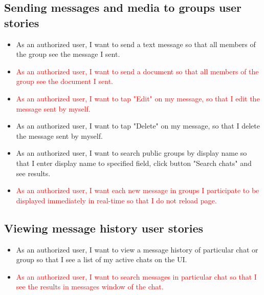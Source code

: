 \subsection{Sending messages and media to groups user stories}
\label{subsec:sending-messages-and-media-to-groups}
\begin{itemize}
    \item As an authorized user, I want to send a text message so that all members of the group see the message I sent.
    \item \textcolor{red}{As an authorized user, I want to send a document so that all members of the group see the document I sent.}
    \item \textcolor{red}{As an authorized user, I want to tap "Edit" on my message, so that I edit the message sent by myself.}
    \item As an authorized user, I want to tap "Delete" on my message, so that I delete the message sent by myself.
    \item As an authorized user, I want to search public groups by display name so that I enter display name to specified field, click button "Search chats" and see results.
    \item \textcolor{red}{As an authorized user, I want each new message in groups I participate to be displayed immediately in real-time so that I do not reload page.}
\end{itemize}

\subsection{Viewing message history user stories}\label{subsec:viewing-message-history-feature-user-stories}
\begin{itemize}
    \item As an authorized user, I want to view a message history of particular chat or group so that I see a list of my active chats on the UI\@.
    \item \textcolor{red}{As an authorized user, I want to search messages in particular chat so that I see the results in messages window of the chat.}
\end{itemize}

